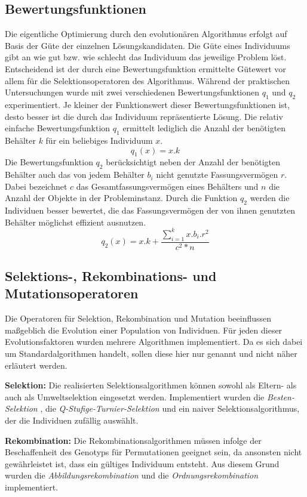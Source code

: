     \subsection{Bewertungsfunktionen}
    Die eigentliche Optimierung durch den evolutionären Algorithmus erfolgt auf Basis der Güte der einzelnen Lösungskandidaten. Die Güte eines Individuums gibt an wie gut bzw. wie schlecht das Individuum das jeweilige Problem löst. Entscheidend ist der durch eine Bewertungsfunktion ermittelte Gütewert vor allem für die Selektionsoperatoren des Algorithmus. Während der praktischen Untersuchungen wurde mit zwei verschiedenen Bewertungsfunktionen $q_1$ und $q_2$ experimentiert. Je kleiner der Funktionswert dieser Bewertungsfunktionen ist, desto besser ist die durch das Individuum repräsentierte Lösung. Die relativ einfache Bewertungsfunktion $q_1$ ermittelt lediglich die Anzahl der benötigten Behälter $k$ für ein beliebiges Individuum $x$.
    $$q_1(x) = x.k$$
    Die Bewertungsfunktion $q_2$ berücksichtigt neben der Anzahl der benötigten Behälter auch das von jedem Behälter $b_i$ nicht genutzte Fassungsvermögen $r$. Dabei bezeichnet $c$ das Gesamtfassungsvermögen eines Behälters und $n$ die Anzahl der Objekte in der Probleminstanz. Durch die Funktion $q_2$ werden die Individuen besser bewertet, die das Fassungsvermögen der von ihnen genutzten Behälter möglichst effizient ausnutzen. 
    $$q_2(x) = x.k + \frac{\displaystyle\sum_{i = 1}^{k} x.b_i.r^2}{c^2*n}$$

    \subsection{Selektions-, Rekombinations- und Mutationsoperatoren}
    
    Die Operatoren für Selektion, Rekombination und Mutation beeinflussen maßgeblich die Evolution einer Population von Individuen. Für jeden dieser Evolutionsfaktoren wurden mehrere Algorithmen implementiert. Da es sich dabei um Standardalgorithmen handelt, sollen diese hier nur genannt und nicht näher erläutert werden. 

    \textbf{Selektion:} Die realisierten Selektionsalgorithmen können sowohl als Eltern- als auch als Umweltselektion eingesetzt werden. Implementiert wurden die \textit{Besten-Selektion} \parencite[65]{Weicker:2007}, die
\textit{Q-Stufige-Turnier-Selektion} \parencite[69]{Weicker:2007} und ein naiver Selektionsalgorithmus, der die Individuen zufällig auswählt.
    
    \textbf{Rekombination:} Die Rekombinationsalgorithmen müssen infolge der Beschaffenheit des Genotyps für Permutationen geeignet sein, da ansonsten nicht gewährleistet ist, dass ein gültiges Individuum entsteht. Aus diesem Grund wurden die \textit{Abbildungsrekombination} \parencite[133]{Weicker:2007} und die \textit{Ordnungsrekombination} \parencite[29]{Weicker:2007} implementiert.
    
